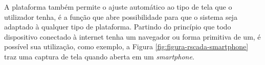         \begin{figure}[!h]
    	\end{figure}
    	
    	\begin{figure}[!h]
    	\end{figure}

A plataforma também permite o ajuste automático ao tipo de tela que o utilizador tenha, é a função que abre possibilidade para que o sistema seja adaptado à qualquer tipo de plataforma. Partindo do princípio que todo dispositivo conectado à internet tenha um navegador ou forma primitiva de um, é possível sua utilização, como exemplo, a Figura \ref{fig:figura-rscada-smartphone} traz uma captura de tela quando aberta em um \textit{smartphone}.

